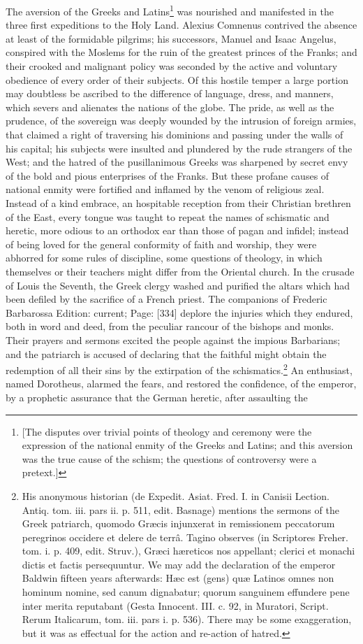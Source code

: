 The aversion of the Greeks and Latins\footnote{[The disputes over trivial points of theology and ceremony were the expression of the national enmity of the Greeks and Latins; and this aversion was the true cause of the schism; the questions of controversy were a pretext.]} was nourished and manifested in the three first expeditions to the Holy Land. Alexius Comnenus contrived the absence at least of the formidable pilgrims; his successors, Manuel and Isaac Angelus, conspired with the Moslems for the ruin of the greatest princes of the Franks; and their crooked and malignant policy was seconded by the active and voluntary obedience of every order of their subjects. Of this hostile temper a large portion may doubtless be ascribed to the difference of language, dress, and manners, which severs and alienates the nations of the globe. The pride, as well as the prudence, of the sovereign was deeply wounded by the intrusion of foreign armies, that claimed a right of traversing his dominions and passing under the walls of his capital; his subjects were insulted and plundered by the rude strangers of the West; and the hatred of the pusillanimous Greeks was sharpened by secret envy of the bold and pious enterprises of the Franks. But these profane causes of national enmity were fortified and inflamed by the venom of religious zeal. Instead of a kind embrace, an hospitable reception from their Christian brethren of the East, every tongue was taught to repeat the names of schismatic and heretic, more odious to an orthodox ear than those of pagan and infidel; instead of being loved for the general conformity of faith and worship, they were abhorred for some rules of discipline, some questions of theology, in which themselves or their teachers might differ from the Oriental church. In the crusade of Louis the Seventh, the Greek clergy washed and purified the altars which had been defiled by the sacrifice of a French priest. The companions of Frederic Barbarossa Edition: current; Page: [334] deplore the injuries which they endured, both in word and deed, from the peculiar rancour of the bishops and monks. Their prayers and sermons excited the people against the impious Barbarians; and the patriarch is accused of declaring that the faithful might obtain the redemption of all their sins by the extirpation of the schismatics.\footnote{His anonymous historian (de Expedit. Asiat. Fred. I. in Canisii Lection. Antiq. tom. iii. pars ii. p. 511, edit. Basnage) mentions the sermons of the Greek patriarch, quomodo Græcis injunxerat in remissionem peccatorum peregrinos occidere et delere de terrâ. Tagino observes (in Scriptores Freher. tom. i. p. 409, edit. Struv.), Græci hæreticos nos appellant; clerici et monachi dictis et factis persequuntur. We may add the declaration of the emperor Baldwin fifteen years afterwards: Hæc est (gens) quæ Latinos omnes non hominum nomine, sed canum dignabatur; quorum sanguinem effundere pene inter merita reputabant (Gesta Innocent. III. c. 92, in Muratori, Script. Rerum Italicarum, tom. iii. pars i. p. 536). There may be some exaggeration, but it was as effectual for the action and re-action of hatred.} An enthusiast, named Dorotheus, alarmed the fears, and restored the confidence, of the emperor, by a prophetic assurance that the German heretic, after assaulting the 